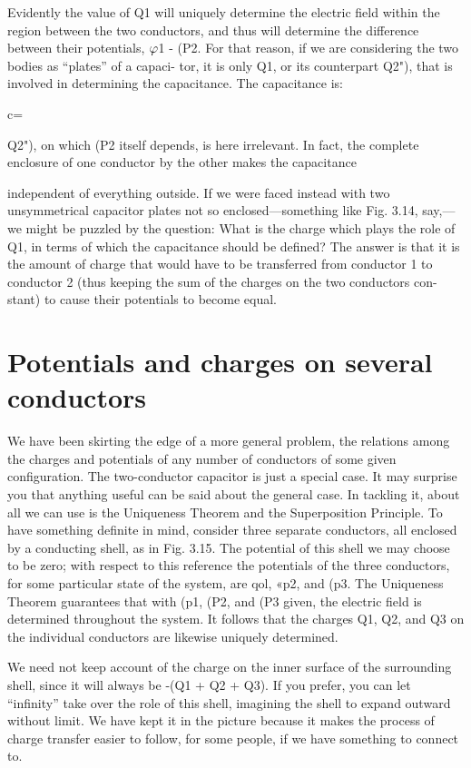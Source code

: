 Evidently the value of Q1 will uniquely determine the electric field
within the region between the two conductors, and thus will determine
the difference between their potentials, $\varphi$1 - (P2. For that
reason, if we are considering the two bodies as ``plates'' of a capaci-
tor, it is only Q1, or its counterpart Q2"), that is involved in determining
the capacitance. The capacitance is:

c=%

Q2"), on which (P2 itself depends, is here irrelevant. In fact, the complete
enclosure of one conductor by the other makes the capacitance

independent of everything outside. If we were faced instead with
two unsymmetrical capacitor plates not so enclosed---something like
Fig. 3.14, say,---we might be puzzled by the question: What is the
charge which plays the role of Q1, in terms of which the capacitance
should be defined? The answer is that it is the amount of charge
that would have to be transferred from conductor 1 to conductor 2
(thus keeping the sum of the charges on the two conductors con-
stant) to cause their potentials to become equal.

\section{Potentials and charges on several conductors}

We have been skirting the edge of a more general problem, the
relations among the charges and potentials of any number of conductors
of some given configuration. The two-conductor capacitor
is just a special case. It may surprise you that anything useful can
be said about the general case. In tackling it, about all we can use
is the Uniqueness Theorem and the Superposition Principle. To
have something definite in mind, consider three separate conductors,
all enclosed by a conducting shell, as in Fig. 3.15. The potential of
this shell we may choose to be zero; with respect to this reference the
potentials of the three conductors, for some particular state of the
system, are qol, «p2, and (p3. The Uniqueness Theorem guarantees
that with (p1, (P2, and (P3 given, the electric field is determined throughout
the system. It follows that the charges Q1, Q2, and Q3 on the
individual conductors are likewise uniquely determined.

We need not keep account of the charge on the inner surface of
the surrounding shell, since it will always be -(Q1 + Q2 + Q3).
If you prefer, you can let ``infinity'' take over the role of this shell,
imagining the shell to expand outward without limit. We have kept
it in the picture because it makes the process of charge transfer easier
to follow, for some people, if we have something to connect to.

